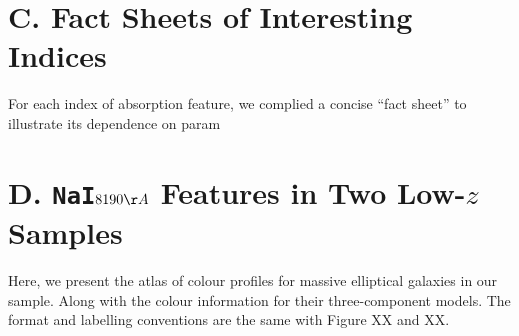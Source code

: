 \documentclass[preprint]{aastex}
\def\nai{{\tt NaI}}
\begin{document}
\begin{CJK*}{UTF8}{gbsn}
\section{C. Fact Sheets of Interesting Indices}

    For each index of absorption feature, we complied a concise ``fact 
    sheet'' to illustrate its dependence on param

\section{D. \nai $8190 \AA$ Features in Two Low-$z$ Samples} 

  Here, we present the atlas of colour profiles for massive elliptical 
  galaxies in our sample.  Along with the colour information for their 
  three-component models.  The format and labelling conventions are the 
  same with Figure XX and XX.  
  


\end{CJK*}
\end{document}
